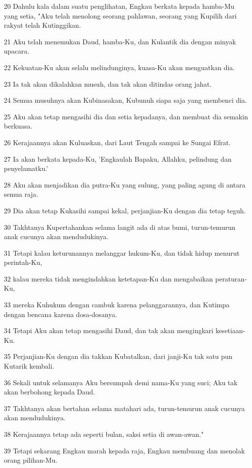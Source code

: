 \par 20 Dahulu kala dalam suatu penglihatan, Engkau berkata kepada hamba-Mu yang setia, "Aku telah menolong seorang pahlawan, seorang yang Kupilih dari rakyat telah Kutinggikan.
\par 21 Aku telah menemukan Daud, hamba-Ku, dan Kulantik dia dengan minyak upacara.
\par 22 Kekuatan-Ku akan selalu melindunginya, kuasa-Ku akan menguatkan dia.
\par 23 Ia tak akan dikalahkan musuh, dan tak akan ditindas orang jahat.
\par 24 Semua musuhnya akan Kubinasakan, Kubunuh siapa saja yang membenci dia.
\par 25 Aku akan tetap mengasihi dia dan setia kepadanya, dan membuat dia semakin berkuasa.
\par 26 Kerajaannya akan Kuluaskan, dari Laut Tengah sampai ke Sungai Efrat.
\par 27 Ia akan berkata kepada-Ku, 'Engkaulah Bapaku, Allahku, pelindung dan penyelamatku.'
\par 28 Aku akan menjadikan dia putra-Ku yang sulung, yang paling agung di antara semua raja.
\par 29 Dia akan tetap Kukasihi sampai kekal, perjanjian-Ku dengan dia tetap teguh.
\par 30 Takhtanya Kupertahankan selama langit ada di atas bumi, turun-temurun anak cucunya akan mendudukinya.
\par 31 Tetapi kalau keturunannya melanggar hukum-Ku, dan tidak hidup menurut perintah-Ku,
\par 32 kalau mereka tidak mengindahkan ketetapan-Ku dan mengabaikan peraturan-Ku,
\par 33 mereka Kuhukum dengan cambuk karena pelanggarannya, dan Kutimpa dengan bencana karena dosa-dosanya.
\par 34 Tetapi Aku akan tetap mengasihi Daud, dan tak akan mengingkari kesetiaan-Ku.
\par 35 Perjanjian-Ku dengan dia takkan Kubatalkan, dari janji-Ku tak satu pun Kutarik kembali.
\par 36 Sekali untuk selamanya Aku bersumpah demi nama-Ku yang suci; Aku tak akan berbohong kepada Daud.
\par 37 Takhtanya akan bertahan selama matahari ada, turun-temurun anak cucunya akan mendudukinya.
\par 38 Kerajaannya tetap ada seperti bulan, saksi setia di awan-awan."
\par 39 Tetapi sekarang Engkau marah kepada raja, Engkau membuang dan menolak orang pilihan-Mu.
